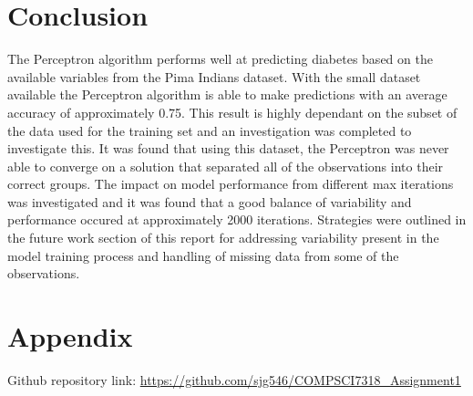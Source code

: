 \documentclass[10pt,twocolumn,letterpaper]{article}
\begin{document}
\section{Conclusion}
The Perceptron algorithm performs well at predicting diabetes based on the available variables from the Pima
Indians dataset. With the small dataset available the Perceptron algorithm is able to make predictions with
an average accuracy of approximately 0.75. This result is highly dependant on the subset of the data used
for the training set and an investigation was completed to investigate this. It was found that using this
dataset, the Perceptron was never able to converge on a solution that separated all of the observations into
their correct groups. The impact on model performance from different max iterations was investigated and it
was found that a good balance of variability and performance occured at approximately 2000 iterations.
Strategies were outlined in the future work section of this report for addressing variability present
in the model training process and handling of missing data from some of the observations.
\small



\section{Appendix}
Github repository link:  \url{https://github.com/sjg546/COMPSCI7318_Assignment1}
\end{document}
